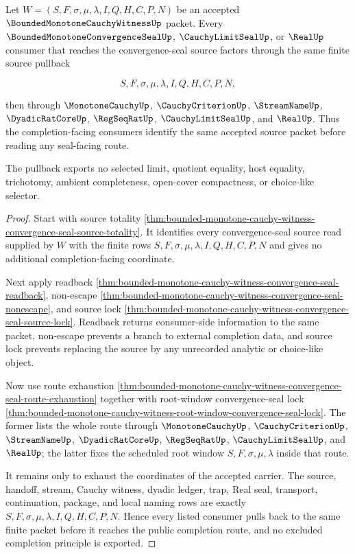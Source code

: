 \begin{theorem}
\label{thm:bounded-monotone-cauchy-witness-convergence-seal-terminal-source-pullback}
Let $W=(S,F,\sigma,\mu,\lambda,I,Q,H,C,P,N)$ be an accepted $\BoundedMonotoneCauchyWitnessUp$ packet. Every $\BoundedMonotoneConvergenceSealUp$, $\CauchyLimitSealUp$, or $\RealUp$ consumer that reaches the convergence-seal source factors through the same finite source pullback

$$
S,F,\sigma,\mu,\lambda,I,Q,H,C,P,N,
$$

then through $\MonotoneCauchyUp$, $\CauchyCriterionUp$, $\StreamNameUp$, $\DyadicRatCoreUp$, $\RegSeqRatUp$, $\CauchyLimitSealUp$, and $\RealUp$. Thus the completion-facing consumers identify the same accepted source packet before reading any seal-facing route.

The pullback exports no selected limit, quotient equality, host equality, trichotomy, ambient completeness, open-cover compactness, or choice-like selector.
\end{theorem}
\begin{proof}
Start with source totality \autoref{thm:bounded-monotone-cauchy-witness-convergence-seal-source-totality}. It identifies every convergence-seal source read supplied by $W$ with the finite rows $S,F,\sigma,\mu,\lambda,I,Q,H,C,P,N$ and gives no additional completion-facing coordinate.

Next apply readback \autoref{thm:bounded-monotone-cauchy-witness-convergence-seal-readback}, non-escape \autoref{thm:bounded-monotone-cauchy-witness-convergence-seal-nonescape}, and source lock \autoref{thm:bounded-monotone-cauchy-witness-convergence-seal-source-lock}. Readback returns consumer-side information to the same packet, non-escape prevents a branch to external completion data, and source lock prevents replacing the source by any unrecorded analytic or choice-like object.

Now use route exhaustion \autoref{thm:bounded-monotone-cauchy-witness-convergence-seal-route-exhaustion} together with root-window convergence-seal lock \autoref{thm:bounded-monotone-cauchy-witness-root-window-convergence-seal-lock}. The former lists the whole route through $\MonotoneCauchyUp$, $\CauchyCriterionUp$, $\StreamNameUp$, $\DyadicRatCoreUp$, $\RegSeqRatUp$, $\CauchyLimitSealUp$, and $\RealUp$; the latter fixes the scheduled root window $S,F,\sigma,\mu,\lambda$ inside that route.

It remains only to exhaust the coordinates of the accepted carrier. The source, handoff, stream, Cauchy witness, dyadic ledger, trap, Real seal, transport, continuation, package, and local naming rows are exactly $S,F,\sigma,\mu,\lambda,I,Q,H,C,P,N$. Hence every listed consumer pulls back to the same finite packet before it reaches the public completion route, and no excluded completion principle is exported.
\end{proof}

